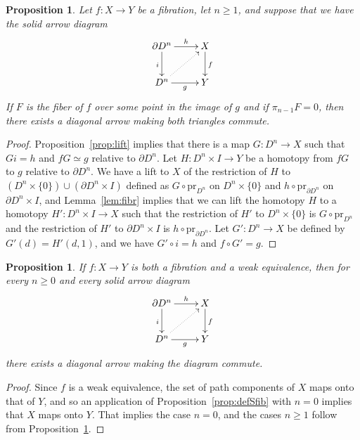 \documentclass[12pt]{amsart}
\numberwithin{equation}{section}
\theoremstyle{slplain}
\newtheorem{prop}[equation]{Proposition}
\theoremstyle{definition}
\theoremstyle{remark}
\newcommand{\propref}{Proposition~\ref}
\newcommand{\lemref}{Lemma~\ref}
\newcommand{\pr}{\mathrm{pr}}
\newcommand{\bdry}{\partial}
\newcommand{\homotopic}{\simeq}
\begin{document}
\begin{prop}
  \label{prop:liftcell}
  Let $f\colon X \to Y$ be a fibration, let $n \ge 1$, and suppose
  that we have the solid arrow diagram
  \begin{displaymath}
    \xymatrix{
      {\partial D^{n}} \ar[r]^-{h} \ar[d]_{i}
      & {X} \ar[d]^{f}\\
      {D^{n}} \ar[r]_-{g} \ar@{..>}[ur]
      & {Y}
    }
  \end{displaymath}
  If $F$ is the fiber of $f$ over some point in the image of $g$ and
  if $\pi_{n-1}F = 0$, then there exists a diagonal arrow making both
  triangles commute.
\end{prop}

\begin{proof}
  \propref{prop:lift} implies that there is a map $G\colon D^{n} \to
  X$ such that $Gi = h$ and $fG \homotopic g$ relative to $\bdry
  D^{n}$.  Let $H\colon D^{n}\times I \to Y$ be a homotopy from $fG$
  to $g$ relative to $\partial D^{n}$.  We have a lift to $X$ of the
  restriction of $H$ to $(D^{n}\times\{0\}) \cup (\partial D^{n}\times
  I)$ defined as $G \circ \pr_{D^{n}}$ on $D^{n}\times \{0\}$ and $h
  \circ \pr_{\partial D^{n}}$ on $\partial D^{n}\times I$, and
  \lemref{lem:fibr} implies that we can lift the homotopy $H$ to a
  homotopy $H'\colon D^{n}\times I \to X$ such that the restriction of
  $H'$ to $D^{n}\times\{0\}$ is $G \circ \pr_{D^{n}}$ and the
  restriction of $H'$ to $\partial D^{n}\times I$ is $h \circ
  \pr_{\partial D^{n}}$.  Let $G'\colon D^{n} \to X$ be defined by
  $G'(d) = H'(d,1)$, and we have $G' \circ i = h$ and $f\circ G' = g$.
\end{proof}


\begin{prop}
  \label{prop:liftcellwe}
  If $f\colon X \to Y$ is both a fibration and a weak equivalence,
  then for every $n \ge 0$ and every solid arrow diagram
  \begin{equation}
    \label{diag:liftcellwe}
    \vcenter{
      \xymatrix{
        {\partial D^{n}} \ar[r]^-{h} \ar[d]_{i}
        & {X} \ar[d]^{f}\\
        {D^{n}} \ar[r]_-{g} \ar@{..>}[ur]
        & {Y}
      }%
    }%
  \end{equation}
  there exists a diagonal arrow making the diagram commute.
\end{prop}

\begin{proof}
  Since $f$ is a weak equivalence, the set of path components of $X$
  maps onto that of $Y$, and so an application of
  \propref{prop:defSfib} with $n = 0$ implies that $X$ maps onto $Y$.
  That implies the case $n = 0$, and the cases $n \ge 1$ follow from
  \propref{prop:liftcell}.
\end{proof}
\end{document}

